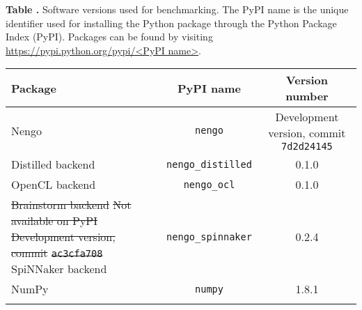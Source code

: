 \documentclass{frontiersSCNS}
\providecommand{\DIFdel}[1]{{\protect\color{red}\sout{#1}}}                      %
\providecommand{\DIFdelFL}[1]{\DIFdel{#1}} %
\providecommand{\DIFdelbeginFL}{} %
\providecommand{\DIFdelendFL}{} %
\begin{document}
\begin{table}[!ht]
\textbf{\label{Tab:01} Table .}{
  Software versions used for benchmarking.
  The PyPI name is the unique identifier used for installing the Python package
  through the Python Package Index (PyPI). Packages can be found by
  visiting \url{https://pypi.python.org/pypi/<PyPI name>}.}

\processtable{ }
{\begin{tabular}{lcc}\toprule
 Package & PyPI name & Version number\\\midrule
 Nengo & \texttt{nengo} & Development version, commit \texttt{7d2d24145} \\
 Distilled backend & \texttt{nengo\_distilled} & 0.1.0 \\
 OpenCL backend & \texttt{nengo\_ocl} & 0.1.0 \\
 \DIFdelbeginFL \DIFdelFL{Brainstorm backend }%
\DIFdelFL{Not available on PyPI }%
\DIFdelFL{Development version, commit }\texttt{\DIFdelFL{ac3cfa708}} %
\DIFdelendFL SpiNNaker backend & \texttt{nengo\_spinnaker} & 0.2.4 \\
 NumPy & \texttt{numpy} & 1.8.1 \\\botrule
\end{tabular}}{}
\end{table}
\end{document}
